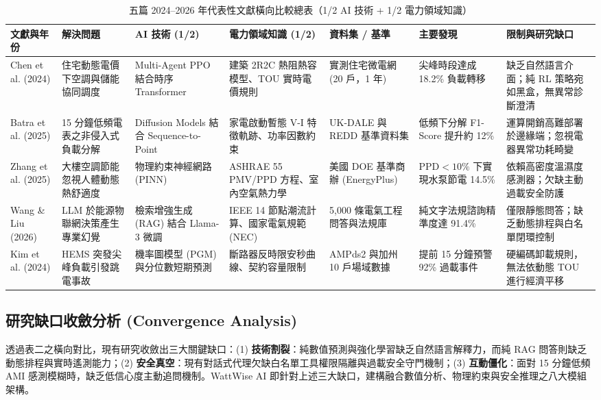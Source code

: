 \documentclass[conference]{IEEEtran}
\begin{document}
\begin{table}[t]
\centering
\caption{五篇 2024--2026 年代表性文獻橫向比較總表（1/2 AI 技術 + 1/2 電力領域知識）}
\label{tab:related_work}
\renewcommand{\arraystretch}{1.25}
\begin{tabular}{@{}p{}p{}p{}p{}p{}p{}p{}@{}}
\toprule
\textbf{文獻與年份} & \textbf{解決問題} & \textbf{AI 技術 (1/2)} & \textbf{電力領域知識 (1/2)} & \textbf{資料集 / 基準} & \textbf{主要發現} & \textbf{限制與研究缺口} \\
\midrule
Chen et al. (2024) \cite{chen2024} & 住宅動態電價下空調與儲能協同調度 & Multi-Agent PPO 結合時序 Transformer & 建築 2R2C 熱阻熱容模型、TOU 實時電價規則 & 實測住宅微電網 (20 戶，1 年) & 尖峰時段達成 18.2\% 負載轉移 & 缺乏自然語言介面；純 RL 策略宛如黑盒，無異常診斷澄清 \\
Batra et al. (2025) \cite{batra2025} & 15 分鐘低頻電表之非侵入式負載分解 & Diffusion Models 結合 Sequence-to-Point & 家電啟動暫態 V-I 特徵軌跡、功率因數約束 & UK-DALE 與 REDD 基準資料集 & 低頻下分解 F1-Score 提升約 12\% & 運算開銷高難部署於邊緣端；忽視電器異常功耗畸變 \\
Zhang et al. (2025) \cite{zhang2025} & 大樓空調節能忽視人體動態熱舒適度 & 物理約束神經網路 (PINN) & ASHRAE 55 PMV/PPD 方程、室內空氣熱力學 & 美國 DOE 基準商辦 (EnergyPlus) & $\text{PPD} < 10\%$ 下實現水泵節電 14.5\% & 依賴高密度溫濕度感測器；欠缺主動過載安全防護 \\
Wang \& Liu (2026) \cite{wang2026} & LLM 於能源物聯網決策產生專業幻覺 & 檢索增強生成 (RAG) 結合 Llama-3 微調 & IEEE 14 節點潮流計算、國家電氣規範 (NEC) & 5,000 條電氣工程問答與法規庫 & 純文字法規諮詢精準度達 91.4\% & 僅限靜態問答；缺乏動態排程與白名單閉環控制 \\
Kim et al. (2024) \cite{kim2024} & HEMS 突發尖峰負載引發跳電事故 & 機率圖模型 (PGM) 與分位數短期預測 & 斷路器反時限安秒曲線、契約容量限制 & AMPds2 與加州 10 戶場域數據 & 提前 15 分鐘預警 92\% 過載事件 & 硬編碼卸載規則，無法依動態 TOU 進行經濟平移 \\
\bottomrule
\end{tabular}
\end{table}

\subsection{研究缺口收斂分析 (Convergence Analysis)}
透過表二之橫向對比，現有研究收斂出三大關鍵缺口：(1) \textbf{技術割裂}：純數值預測與強化學習缺乏自然語言解釋力，而純 RAG 問答則缺乏動態排程與實時遙測能力；(2) \textbf{安全真空}：現有對話式代理欠缺白名單工具權限隔離與過載安全守門機制；(3) \textbf{互動僵化}：面對 15 分鐘低頻 AMI 感測模糊時，缺乏低信心度主動追問機制。WattWise AI 即針對上述三大缺口，建構融合數值分析、物理約束與安全推理之八大模組架構。
\end{document}

